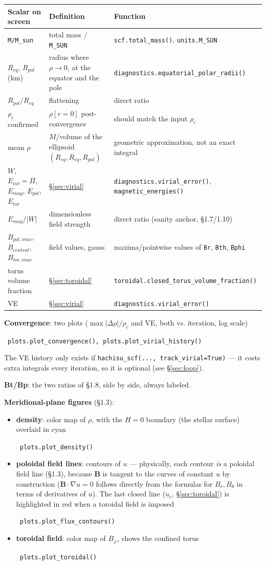 \documentclass[11pt,a4paper]{scrartcl}
\newcommand{\arrowto}[1]{%
  \par\vspace{2pt}\noindent{\color{linkblue}$\rightarrow$}~\texttt{\small #1}\par\vspace{2pt}}
\newcommand{\code}[1]{\texttt{\small #1}}
\begin{document}
\begingroup\small
\begin{longtable}{@{}p{3.4cm}p{5.2cm}p{5.4cm}@{}}
\toprule
\textbf{Scalar on screen} & \textbf{Definition} & \textbf{Function}\\
\midrule
\endhead
\code{M/M\_sun} & total mass / \code{M\_SUN} & \code{scf.total\_mass()}, \code{units.M\_SUN}\\
$R_{eq}$, $R_{pol}$ (km) & radius where $\rho\to0$, at the equator and the pole & \code{diagnostics.equatorial\_polar\_radii()}\\
$R_{pol}/R_{eq}$ & flattening & direct ratio\\
$\rho_c$ confirmed & $\rho[r{=}0]$ post-convergence & should match the input $\rho_c$\\
mean $\rho$ & $M$/volume of the ellipsoid $(R_{eq},R_{eq},R_{pol})$ & geometric approximation, not an exact integral\\
$W$, $E_{int}{=}\Pi$, $E_{mag}$, $E_{pol}$, $E_{tor}$ & \S\ref{sec:virial} & \code{diagnostics.virial\_error()}, \code{magnetic\_energies()}\\
$E_{mag}/|W|$ & dimensionless field strength & direct ratio (sanity anchor, \S1.7/1.10)\\
$B_{pol,max}$, $B_{central}$, $B_{tor,max}$ & field values, gauss & maxima/pointwise values of \code{Br}, \code{Bth}, \code{Bphi}\\
torus volume fraction & \S\ref{sec:toroidal} & \code{toroidal.closed\_torus\_volume\_fraction()}\\
VE & \S\ref{sec:virial} & \code{diagnostics.virial\_error()}\\
\bottomrule
\end{longtable}
\endgroup

\textbf{Convergence}: two plots ($\max|\Delta\rho|/\rho_c$ and VE, both
vs. iteration, log scale) \arrowto{plots.plot\_convergence(), plots.plot\_virial\_history()}
The VE history only exists if \code{hachisu\_scf(..., track\_virial=True)}
--- it costs extra integrals every iteration, so it is optional (see
\S\ref{sec:loop}).

\textbf{Bt/Bp}: the two ratios of \S1.8, side by side, always labeled.

\textbf{Meridional-plane figures} (\S1.3):
\begin{itemize}[leftmargin=1.4em]
\item \textbf{density}: color map of $\rho$, with the $H=0$ boundary (the
  stellar surface) overlaid in cyan \arrowto{plots.plot\_density()}
\item \textbf{poloidal field lines}: contours of $u$ --- physically, each
  contour \emph{is} a poloidal field line (\S1.3), because $\mathbf{B}$
  is tangent to the curves of constant $u$ by construction
  ($\mathbf{B}\cdot\nabla u=0$ follows directly from the formulas for
  $B_r,B_\theta$ in terms of derivatives of $u$). The last closed line
  ($u_c$, \S\ref{sec:toroidal}) is highlighted in red when a toroidal
  field is imposed \arrowto{plots.plot\_flux\_contours()}
\item \textbf{toroidal field}: color map of $B_\varphi$, shows the
  confined torus \arrowto{plots.plot\_toroidal()}
\end{itemize}
\end{document}
